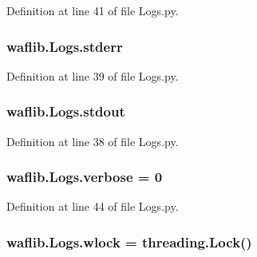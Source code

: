 Definition at line 41 of file Logs.\+py.

\subsubsection[{\texorpdfstring{stderr}{stderr}}]{\setlength{\rightskip}{0pt plus 5cm}waflib.\+Logs.\+stderr}\hypertarget{namespacewaflib_1_1_logs_ac627e89af00505ebc02bd5fc6242c9ad}{}\label{namespacewaflib_1_1_logs_ac627e89af00505ebc02bd5fc6242c9ad}


Definition at line 39 of file Logs.\+py.

\subsubsection[{\texorpdfstring{stdout}{stdout}}]{\setlength{\rightskip}{0pt plus 5cm}waflib.\+Logs.\+stdout}\hypertarget{namespacewaflib_1_1_logs_af29121f123b22497c143dda1d85c07f1}{}\label{namespacewaflib_1_1_logs_af29121f123b22497c143dda1d85c07f1}


Definition at line 38 of file Logs.\+py.

\subsubsection[{\texorpdfstring{verbose}{verbose}}]{ waflib.\+Logs.\+verbose = 0}\hypertarget{namespacewaflib_1_1_logs_ad9dd20b34692d71ff82d165737aa0505}{}\label{namespacewaflib_1_1_logs_ad9dd20b34692d71ff82d165737aa0505}


Definition at line 44 of file Logs.\+py.

\subsubsection[{\texorpdfstring{wlock}{wlock}}]{\setlength{\rightskip}{0pt plus 5cm}waflib.\+Logs.\+wlock = threading.\+Lock()}\hypertarget{namespacewaflib_1_1_logs_a30dce00452028144a8eb46b24509aedb}{}\label{namespacewaflib_1_1_logs_a30dce00452028144a8eb46b24509aedb}


